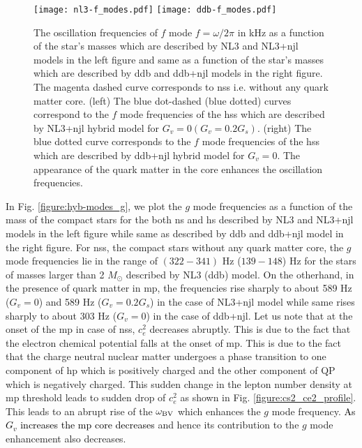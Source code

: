\documentclass[a4paper, 11pt]{article}
\newcommand{\magenta}[1]{\textcolor{black}{#1}}
\begin{document}
\begin{figure}
\centering
\texttt{[image: nl3-f\_modes.pdf]}
\texttt{[image: ddb-f\_modes.pdf]}
\caption{The oscillation frequencies of $f$ mode $f={\omega}/{2\pi}$ in kHz as a function of the star's masses which are described by NL3 and NL3+\ac{njl} models in the left figure and same as a function of the star's masses which are described by \ac{ddb} and \ac{ddb}+\ac{njl} models in the right figure. The magenta dashed curve corresponds to \ac{ns}s i.e. without any quark matter core. (left) The blue dot-dashed (blue dotted) curves correspond to the $f$ mode frequencies of the \ac{hs}s which are described by NL3+\ac{njl} hybrid model for $G_v=0 (G_v=0.2 G_s)$. (right) The blue dotted curve corresponds to the $f$ mode frequencies of the \ac{hs}s which are described by \ac{ddb}+\ac{njl} hybrid model for $G_v=0$. The appearance of the quark matter in the core enhances the oscillation frequencies.}
\label{figure:hyb-modes_f}
\end{figure}

In Fig. \ref{figure:hyb-modes_g}, we plot the $g$ mode frequencies as a function of the mass of the compact 
stars for the both \ac{ns} and \ac{hs} described by NL3 and NL3+\ac{njl} models in the left figure while
 same as described by \ac{ddb} and \ac{ddb}+\ac{njl} model in the right figure. For \ac{ns}s, the compact stars
 without any quark matter core, the $g$ mode frequencies lie in the range of $(322-341)$ Hz ($139-148$) Hz for
 the stars of masses larger than 2 $M_{\odot}$ described by NL3 (\ac{ddb}) model. On the otherhand,
 in the presence of quark matter in \ac{mp}, the frequencies rise sharply to about 589 Hz ($G_v=0$) and
 589 Hz ($G_v=0.2 G_s$) in the case of NL3+\ac{njl} model while same rises sharply to about
 303 Hz ($G_v=0$) in the case of \ac{ddb}+\ac{njl}. Let us note that at the onset of the \ac{mp} in case of \ac{ns}s,
 $c_e^2$ decreases abruptly. This is due to the fact that the electron chemical potential falls at the onset of \ac{mp}.
 This is due to the fact that the charge neutral nuclear matter undergoes a phase transition to one component of \ac{hp}
 which is positively charged and the other component of QP which is negatively charged. This sudden change in the
 lepton number density at \ac{mp} threshold leads to sudden drop of $c_e^2$ as shown in Fig. \ref{figure:cs2_ce2_profile}.
 This leads to an abrupt rise of the $\omega_{\rm BV}$ which enhances the $g$ mode frequency.
\magenta{As $G_v$ increases the \ac{mp} core decreases} and hence its contribution to the $g$ mode enhancement also decreases.
\end{document}
